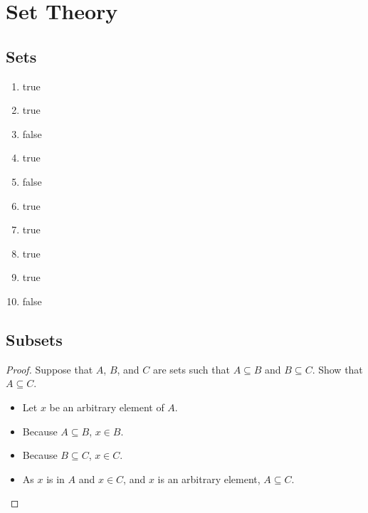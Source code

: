 \chapter{Set Theory}

\section{Sets}
\begin{enumerate}
    \item true
    \item true
    \item false
    \item true
    \item false
    \item true
    \item true
    \item true
    \item true
    \item false
\end{enumerate}

\section{Subsets}
\begin{proof}
    Suppose that \(A\), \(B\), and \(C\) are sets such that \(A \subseteq B\) and \(B \subseteq C\). Show that \(A \subseteq C\).
    \begin{itemize}
        \item Let \(x\) be an arbitrary element of \(A\).
        \item Because \(A \subseteq B\), \(x \in B\).
        \item Because \(B \subseteq C\), \(x \in C\).
        \item As \(x\) is in \(A\) and \(x \in C\), and \(x\) is an arbitrary element, \(A \subseteq C\).
    \end{itemize}
\end{proof}


